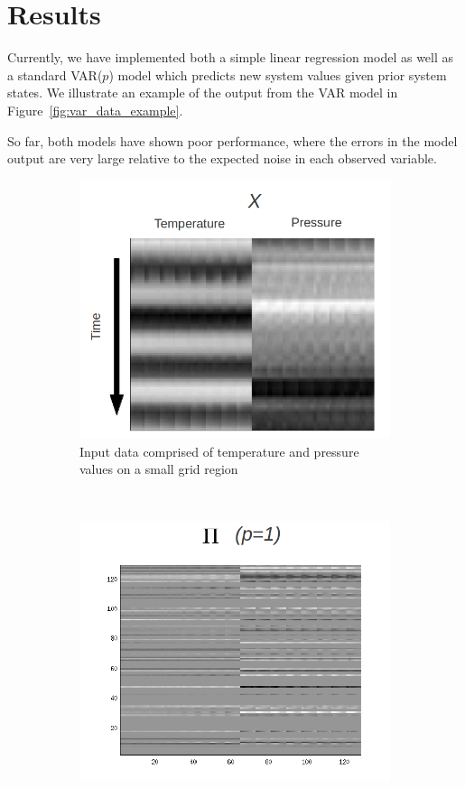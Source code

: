 \documentclass{article} %
\newcommand{\VARlag}{p}
\begin{document}
\section{Results}
\label{sec:results}
Currently, we have implemented both a simple linear regression model as well as a standard VAR($\VARlag$) model which predicts new system values given prior system states. We illustrate an example of the output from the VAR model in Figure~\ref{fig:var_data_example}.

So far, both models have shown poor performance, where the errors in the model output are very large relative to the expected noise in each observed variable.

\begin{figure}
\centering
\begin{subfigure}[]{0.5\textwidth}
	\includegraphics[width=1.0\textwidth]{./var_data_example.png}
	\caption{Input data comprised of temperature and pressure values on a small grid region}
\end{subfigure}
\\
\begin{subfigure}{0.2\textwidth}
	\includegraphics[width=1.0\textwidth]{./var_params_lag_1.png}

\end{subfigure}
\end{figure}
\end{document}
